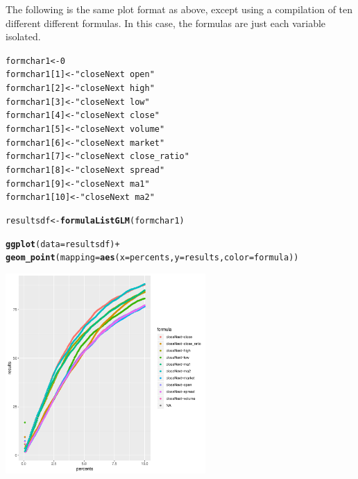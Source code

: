 \documentclass{article}\usepackage[]{graphicx}\usepackage[]{color}
\makeatletter
\newcommand{\hlnum}[1]{\textcolor[rgb]{0.686,0.059,0.569}{#1}}%
\newcommand{\hlstr}[1]{\textcolor[rgb]{0.192,0.494,0.8}{#1}}%
\newcommand{\hlopt}[1]{\textcolor[rgb]{0,0,0}{#1}}%
\newcommand{\hlstd}[1]{\textcolor[rgb]{0.345,0.345,0.345}{#1}}%
\newcommand{\hlkwb}[1]{\textcolor[rgb]{0.69,0.353,0.396}{#1}}%
\newcommand{\hlkwc}[1]{\textcolor[rgb]{0.333,0.667,0.333}{#1}}%
\newcommand{\hlkwd}[1]{\textcolor[rgb]{0.737,0.353,0.396}{\textbf{#1}}}%
\newenvironment{kframe}{%
 \def\at@end@of@kframe{}%
 \ifinner\ifhmode%
  \def\at@end@of@kframe{\end{minipage}}%
  \begin{minipage}{\columnwidth}%
 \fi\fi%
 \def\FrameCommand##1{\hskip\@totalleftmargin \hskip-\fboxsep
 \colorbox{shadecolor}{##1}\hskip-\fboxsep
     \hskip-\linewidth \hskip-\@totalleftmargin \hskip\columnwidth}%
 \MakeFramed {\advance\hsize-\width
   \@totalleftmargin\z@ \linewidth\hsize
   \@setminipage}}%
 {\par\unskip\endMakeFramed%
 \at@end@of@kframe}
\newenvironment{knitrout}{}{} %
\makeatother
\begin{document}
The following is the same plot format as above, except using a compilation of ten different different formulas. In this case, the formulas are just each variable isolated.
\begin{knitrout}
\color{fgcolor}\begin{kframe}
\begin{alltt}
  \hlstd{formchar1}    \hlkwb{<-} \hlnum{0}
  \hlstd{formchar1[}\hlnum{1}\hlstd{]} \hlkwb{<-} \hlstr{"closeNext~open"}
  \hlstd{formchar1[}\hlnum{2}\hlstd{]} \hlkwb{<-} \hlstr{"closeNext~high"}
  \hlstd{formchar1[}\hlnum{3}\hlstd{]} \hlkwb{<-} \hlstr{"closeNext~low"}
  \hlstd{formchar1[}\hlnum{4}\hlstd{]} \hlkwb{<-} \hlstr{"closeNext~close"}
  \hlstd{formchar1[}\hlnum{5}\hlstd{]} \hlkwb{<-} \hlstr{"closeNext~volume"}
  \hlstd{formchar1[}\hlnum{6}\hlstd{]} \hlkwb{<-} \hlstr{"closeNext~market"}
  \hlstd{formchar1[}\hlnum{7}\hlstd{]} \hlkwb{<-} \hlstr{"closeNext~close_ratio"}
  \hlstd{formchar1[}\hlnum{8}\hlstd{]} \hlkwb{<-} \hlstr{"closeNext~spread"}
  \hlstd{formchar1[}\hlnum{9}\hlstd{]} \hlkwb{<-} \hlstr{"closeNext~ma1"}
  \hlstd{formchar1[}\hlnum{10}\hlstd{]}\hlkwb{<-} \hlstr{"closeNext~ma2"}

\hlstd{resultsdf} \hlkwb{<-} \hlkwd{formulaListGLM}\hlstd{(formchar1)}
\end{alltt}
\end{kframe}
\end{knitrout}

\begin{center}
\begin{knitrout}
\color{fgcolor}\begin{kframe}
\begin{alltt}
\hlkwd{ggplot}\hlstd{(}\hlkwc{data}\hlstd{=resultsdf)} \hlopt{+}
  \hlkwd{geom_point}\hlstd{(}\hlkwc{mapping} \hlstd{=} \hlkwd{aes}\hlstd{(}\hlkwc{x}\hlstd{=percents,}\hlkwc{y}\hlstd{=results,}\hlkwc{color}\hlstd{=formula))}
\end{alltt}
\end{kframe}
\includegraphics[width=3in,height=3in]{figure/unnamed-chunk-17-1} 

\end{knitrout}
\end{center}
\end{document}
